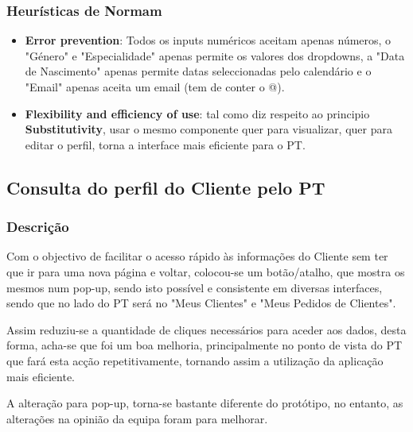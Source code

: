 \subsubsection{Heurísticas de Normam}
\begin{itemize}
    \item \textbf{Error prevention}: Todos os inputs numéricos aceitam apenas números, o "Género" e "Especialidade" apenas permite os valores dos dropdowns, a "Data de Nascimento" apenas permite datas seleccionadas pelo calendário e o "Email" apenas aceita um email (tem de conter o @).
    \item \textbf{Flexibility and efficiency of use}: tal como diz respeito ao principio \textbf{Substitutivity}, usar o mesmo componente quer para visualizar, quer para editar o perfil, torna a interface mais eficiente para o PT.
\end{itemize}

\subsection{Consulta do perfil do Cliente pelo PT}
\label{subsec:perfilclientbypt}

\subsubsection{Descrição}
\hspace{5mm} Com o objectivo de facilitar o acesso rápido às informações do Cliente sem ter que ir para uma nova página e voltar, colocou-se um botão/atalho, que mostra os mesmos num pop-up, sendo isto possível e consistente em diversas interfaces, sendo que no lado do PT será no "Meus Clientes" e "Meus Pedidos de Clientes". 

\hspace{5mm} Assim reduziu-se a quantidade de cliques necessários para aceder aos dados, desta forma, acha-se que foi um boa melhoria, principalmente no ponto de vista do PT que fará esta acção repetitivamente, tornando assim a utilização da aplicação mais eficiente. 

\hspace{5mm} A alteração para pop-up, torna-se bastante diferente do protótipo, no entanto, as alterações na opinião da equipa foram para melhorar.

